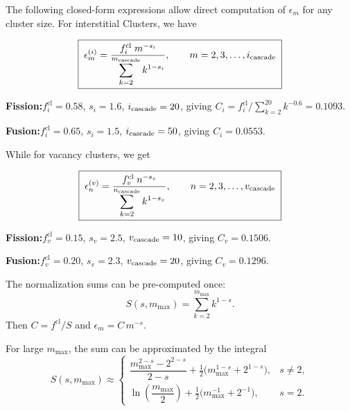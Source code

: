 \documentclass[pdflatex,sn-basic]{sn-jnl} %
\newcommand{\cascade}{_{\text{cascade}}}
\begin{document}
The following closed-form expressions allow direct computation of
$\epsilon_m$ for any cluster size. For interstitial Clusters, we have

\begin{equation}
  \boxed{\;
  \epsilon_m^{(i)} = \frac{f_i^{\mathrm{cl}}\;m^{-s_i}}
  {\displaystyle\sum_{k=2}^{m\cascade} k^{1-s_i}},
  \qquad m = 2, 3, \ldots, i_{\rm cascade}
  \;}
  \label{eq:eps_i_formula}
\end{equation}

\noindent
\textbf{Fission:}\quad $f_i^{\mathrm{cl}} = 0.58$,\;
$s_i = 1.6$,\; $i_{\rm cascade} = 20$,\; giving
$C_i = f_i^{\mathrm{cl}}\big/\!\sum_{k=2}^{20} k^{-0.6} = 0.1093$.

\medskip\noindent
\textbf{Fusion:}\quad $f_i^{\mathrm{cl}} = 0.65$,\;
$s_i = 1.5$,\; $i_{\rm cascade} = 50$,\; giving
$C_i = 0.0553$.

While for vacancy clusters, we get

\begin{equation}
  \boxed{\;
  \epsilon_n^{(v)} = \frac{f_v^{\mathrm{cl}}\;n^{-s_v}}
  {\displaystyle\sum_{k=2}^{n\cascade} k^{1-s_v}},
  \qquad n = 2, 3, \ldots, v_{\rm cascade}
  \;}
  \label{eq:eps_v_formula}
\end{equation}

\noindent
\textbf{Fission:}\quad $f_v^{\mathrm{cl}} = 0.15$,\;
$s_v = 2.5$,\; $v_{\rm cascade} = 10$,\; giving
$C_v = 0.1506$.

\medskip\noindent
\textbf{Fusion:}\quad $f_v^{\mathrm{cl}} = 0.20$,\;
$s_v = 2.3$,\; $v_{\rm cascade} = 20$,\; giving
$C_v = 0.1296$.

The normalization sums can be pre-computed once:
\begin{equation}
  S(s, m_{\max}) = \sum_{k=2}^{m_{\max}} k^{1-s}.
  \label{eq:norm_sum}
\end{equation}
Then $C = f^{\mathrm{cl}} / S$ and
$\epsilon_m = C\,m^{-s}$.

For large $m_{\max}$, the sum can be approximated by the integral
\begin{equation}
  S(s, m_{\max}) \approx
  \begin{cases}
    \dfrac{m_{\max}^{2-s} - 2^{2-s}}{2-s} + \tfrac{1}{2}
    \bigl(m_{\max}^{1-s} + 2^{1-s}\bigr),
    & s \neq 2, \\[6pt]
    \ln\!\left(\dfrac{m_{\max}}{2}\right) + \tfrac{1}{2}
    \bigl(m_{\max}^{-1} + 2^{-1}\bigr), & s = 2.
  \end{cases}
  \label{eq:S_approx}
\end{equation}
\end{document}
